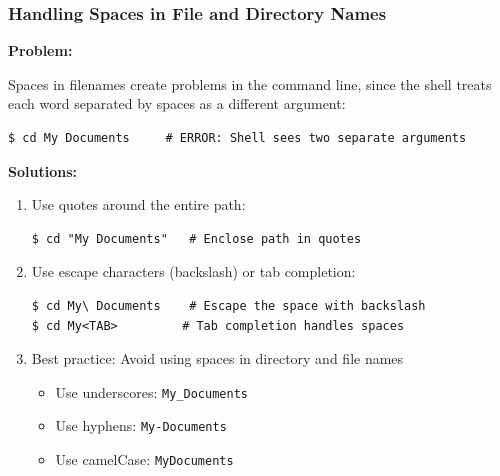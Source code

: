 \documentclass[10pt]{beamer}
\begin{document}
\begin{frame}[fragile]
    \frametitle{Handling Spaces in File and Directory Names}
    \textbf{Problem:}
        
     Spaces in filenames create problems in the command line, since the shell treats each word separated by spaces as a different argument:
    \begin{verbatim}
$ cd My Documents     # ERROR: Shell sees two separate arguments
    \end{verbatim}
    \textbf{Solutions:}
    \begin{enumerate}
        \item Use quotes around the entire path:
\begin{verbatim}
$ cd "My Documents"   # Enclose path in quotes
\end{verbatim}
        \item Use escape characters (backslash) or tab completion:
\begin{verbatim}
$ cd My\ Documents    # Escape the space with backslash
$ cd My<TAB>         # Tab completion handles spaces
\end{verbatim}
        \item Best practice: Avoid using spaces in directory and file names
        \begin{itemize}
            \item Use underscores: \texttt{My\_Documents}
            \item Use hyphens: \texttt{My-Documents} 
            \item Use camelCase: \texttt{MyDocuments}
        \end{itemize}
    \end{enumerate}
\end{frame}
\end{document}
